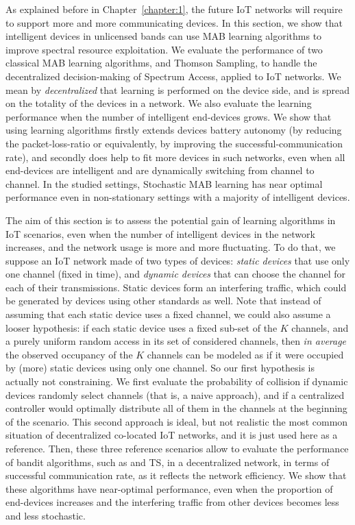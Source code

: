 As explained before in Chapter~\ref{chapter:1}, the future IoT networks will require to support more and more communicating devices.
In this section, we show that intelligent devices in unlicensed bands can use MAB learning algorithms to improve spectral resource exploitation.
%
We evaluate the performance of two classical MAB learning algorithms, \UCB{} and Thomson Sampling, to handle the decentralized decision-making of Spectrum Access, applied to IoT networks.
We mean by \emph{decentralized} that learning is performed on the device side, and is spread on the totality of the devices in a network.
We also evaluate the learning performance when the number of intelligent end-devices grows.
%
We show that using learning algorithms
firstly extends devices battery autonomy (by reducing the packet-loss-ratio or equivalently, by improving the successful-communication rate),
and secondly does help to fit more devices in such networks, even when all end-devices are intelligent and are dynamically switching from channel to channel.
In the studied settings,
Stochastic MAB learning
has near optimal performance even in non-stationary settings with a majority of intelligent devices.


The aim of this section is to assess the potential gain of learning algorithms in IoT scenarios, even when the number of intelligent devices in the network increases,
and the network usage is more and more fluctuating.
To do that, we suppose an IoT network made of two types of devices: \emph{static devices} that use only one channel (fixed in time), and \emph{dynamic devices} that can choose the channel for each of their transmissions. Static devices form an interfering traffic, which could be generated by devices using other standards as well.
Note that instead of assuming that each static device uses a fixed channel, we could also assume a looser hypothesis: if each static device uses a fixed sub-set of the $K$ channels, and a purely uniform random access in its set of considered channels, then \emph{in average} the observed occupancy of the $K$ channels can be modeled as if it were occupied by (more) static devices using only one channel. So our first hypothesis is actually not constraining.
We first evaluate the probability of collision if dynamic devices randomly select channels (that is, a naive approach), and if a centralized controller would optimally distribute all of them in the channels at the beginning of the scenario.
This second approach is ideal, but not realistic the most common situation of decentralized co-located IoT networks, and it is just used here as a reference.
Then, these three reference scenarios allow to evaluate the performance of bandit algorithms, such as \UCB{} and TS, in a decentralized network, in terms of successful communication rate, as it reflects the network efficiency.
We show that these algorithms have near-optimal performance, even when the proportion of end-devices increases and the interfering traffic from other devices becomes less and less stochastic.


